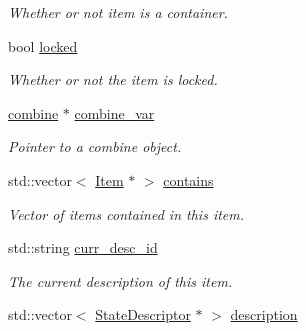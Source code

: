 \begin{DoxyCompactItemize}
\begin{DoxyCompactList}\small\item\em \-Whether or not item is a container. \end{DoxyCompactList}\item 
\hypertarget{class_item_ad83d99679394b23a06681d21eacd312e}{
bool \hyperlink{class_item_ad83d99679394b23a06681d21eacd312e}{locked}}
\label{class_item_ad83d99679394b23a06681d21eacd312e}

\begin{DoxyCompactList}\small\item\em \-Whether or not the item is locked. \end{DoxyCompactList}\item 
\hypertarget{class_item_a7dc399a5ff88b8f2f9bfef1871dfd0a0}{
\hyperlink{classcombine}{combine} $\ast$ \hyperlink{class_item_a7dc399a5ff88b8f2f9bfef1871dfd0a0}{combine\-\_\-var}}
\label{class_item_a7dc399a5ff88b8f2f9bfef1871dfd0a0}

\begin{DoxyCompactList}\small\item\em \-Pointer to a combine object. \end{DoxyCompactList}\item 
\hypertarget{class_item_a226a0752ee3d4218d44f6de2f787a3c9}{
std\-::vector$<$ \hyperlink{class_item}{\-Item} $\ast$ $>$ \hyperlink{class_item_a226a0752ee3d4218d44f6de2f787a3c9}{contains}}
\label{class_item_a226a0752ee3d4218d44f6de2f787a3c9}

\begin{DoxyCompactList}\small\item\em \-Vector of items contained in this item. \end{DoxyCompactList}\item 
\hypertarget{class_item_a3c36a19c6fae89b169cc1acf555532dd}{
std\-::string \hyperlink{class_item_a3c36a19c6fae89b169cc1acf555532dd}{curr\-\_\-desc\-\_\-id}}
\label{class_item_a3c36a19c6fae89b169cc1acf555532dd}

\begin{DoxyCompactList}\small\item\em \-The current description of this item. \end{DoxyCompactList}\item 
\hypertarget{class_item_ab27e598cd37ca13b26c40d929d85400d}{
std\-::vector$<$ \hyperlink{class_state_descriptor}{\-State\-Descriptor} $\ast$ $>$ \hyperlink{class_item_ab27e598cd37ca13b26c40d929d85400d}{description}}
\label{class_item_ab27e598cd37ca13b26c40d929d85400d}


\end{DoxyCompactItemize}
